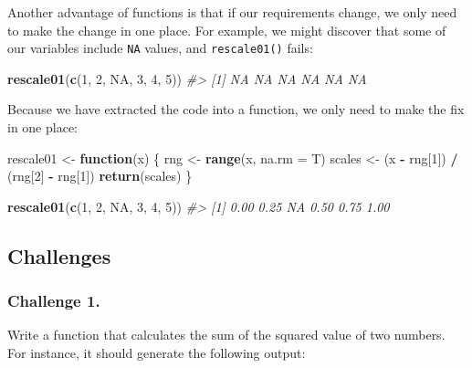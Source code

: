 \documentclass[]{book}
\newenvironment{Shaded}{\begin{snugshade}}{\end{snugshade}}
\newcommand{\KeywordTok}[1]{\textcolor[rgb]{0.13,0.29,0.53}{\textbf{#1}}}
\newcommand{\DataTypeTok}[1]{\textcolor[rgb]{0.13,0.29,0.53}{#1}}
\newcommand{\DecValTok}[1]{\textcolor[rgb]{0.00,0.00,0.81}{#1}}
\newcommand{\StringTok}[1]{\textcolor[rgb]{0.31,0.60,0.02}{#1}}
\newcommand{\CommentTok}[1]{\textcolor[rgb]{0.56,0.35,0.01}{\textit{#1}}}
\newcommand{\OtherTok}[1]{\textcolor[rgb]{0.56,0.35,0.01}{#1}}
\newcommand{\ControlFlowTok}[1]{\textcolor[rgb]{0.13,0.29,0.53}{\textbf{#1}}}
\newcommand{\OperatorTok}[1]{\textcolor[rgb]{0.81,0.36,0.00}{\textbf{#1}}}
\newcommand{\NormalTok}[1]{#1}
\begin{document}
Another advantage of functions is that if our requirements change, we
only need to make the change in one place. For example, we might
discover that some of our variables include \texttt{NA} values, and
\texttt{rescale01()} fails:

\begin{Shaded}
\begin{Highlighting}[]
\KeywordTok{rescale01}\NormalTok{(}\KeywordTok{c}\NormalTok{(}\DecValTok{1}\NormalTok{, }\DecValTok{2}\NormalTok{, }\OtherTok{NA}\NormalTok{, }\DecValTok{3}\NormalTok{, }\DecValTok{4}\NormalTok{, }\DecValTok{5}\NormalTok{))}
\CommentTok{#> [1] NA NA NA NA NA NA}
\end{Highlighting}
\end{Shaded}

Because we have extracted the code into a function, we only need to make
the fix in one place:

\begin{Shaded}
\begin{Highlighting}[]
\NormalTok{rescale01 <-}\StringTok{ }\ControlFlowTok{function}\NormalTok{(x) \{}
\NormalTok{  rng <-}\StringTok{ }\KeywordTok{range}\NormalTok{(x, }\DataTypeTok{na.rm =}\NormalTok{ T)}
\NormalTok{  scales <-}\StringTok{ }\NormalTok{(x }\OperatorTok{-}\StringTok{ }\NormalTok{rng[}\DecValTok{1}\NormalTok{]) }\OperatorTok{/}\StringTok{ }\NormalTok{(rng[}\DecValTok{2}\NormalTok{] }\OperatorTok{-}\StringTok{ }\NormalTok{rng[}\DecValTok{1}\NormalTok{])}
  \KeywordTok{return}\NormalTok{(scales)}
\NormalTok{\}}

\KeywordTok{rescale01}\NormalTok{(}\KeywordTok{c}\NormalTok{(}\DecValTok{1}\NormalTok{, }\DecValTok{2}\NormalTok{, }\OtherTok{NA}\NormalTok{, }\DecValTok{3}\NormalTok{, }\DecValTok{4}\NormalTok{, }\DecValTok{5}\NormalTok{))}
\CommentTok{#> [1] 0.00 0.25   NA 0.50 0.75 1.00}
\end{Highlighting}
\end{Shaded}

\subsection{Challenges}\label{challenges-16}

\subsubsection*{Challenge 1.}\label{challenge-1.-13}

Write a function that calculates the sum of the squared value of two
numbers. For instance, it should generate the following output:
\end{document}
